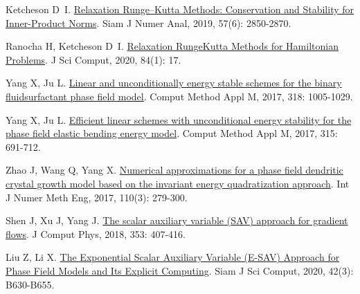 \begin{thebibliography}{77}
    Ketcheson D~I.
    \newblock \href{https://epubs.siam.org/doi/abs/10.1137/19M1263662}{Relaxation {{Runge--Kutta Methods}}: {{Conservation}} and {{Stability}} for {{Inner-Product Norms}}}\allowbreak[J].
    \newblock Siam J Numer Anal, 2019, 57\allowbreak (6): 2850-2870.
    
    Ranocha H, Ketcheson D~I.
    \newblock \href{https://link.springer.com/10.1007/s10915-020-01277-y}{Relaxation {{Runge}}{\textendash}{{Kutta Methods}} for {{Hamiltonian Problems}}}\allowbreak[J].
    \newblock J Sci Comput, 2020, 84\allowbreak (1): 17.
    
    Yang X, Ju L.
    \newblock \href{https://www.sciencedirect.com/science/article/pii/S0045782516317856}{Linear and unconditionally energy stable schemes for the binary fluid{\textendash}surfactant phase field model}\allowbreak[J].
    \newblock Comput Method Appl M, 2017, 318: 1005-1029.
    
    Yang X, Ju L.
    \newblock \href{https://www.sciencedirect.com/science/article/pii/S0045782516306016}{Efficient linear schemes with unconditional energy stability for the phase field elastic bending energy model}\allowbreak[J].
    \newblock Comput Method Appl M, 2017, 315: 691-712.
    
    Zhao J, Wang Q, Yang X.
    \newblock \href{https://onlinelibrary.wiley.com/doi/abs/10.1002/nme.5372}{Numerical approximations for a phase field dendritic crystal growth model based on the invariant energy quadratization approach}\allowbreak[J].
    \newblock Int J Numer Meth Eng, 2017, 110\allowbreak (3): 279-300.
    
    Shen J, Xu J, Yang J.
    \newblock \href{https://www.sciencedirect.com/science/article/pii/S002199911730774X}{The scalar auxiliary variable ({{SAV}}) approach for gradient flows}\allowbreak[J].
    \newblock J Comput Phys, 2018, 353: 407-416.
    
    Liu Z, Li X.
    \newblock \href{https://epubs.siam.org/doi/10.1137/19M1305914}{The {{Exponential Scalar Auxiliary Variable}} ({{E-SAV}}) {{Approach}} for {{Phase Field Models}} and {{Its Explicit Computing}}}\allowbreak[J].
    \newblock Siam J Sci Comput, 2020, 42\allowbreak (3): B630-B655.
    

\end{thebibliography}
